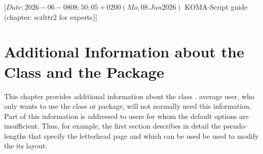 %
%
%
%
%
%
%

                 [$Date: 2026-06-08 08:50:05 +0200 (Mo, 08. Jun 2026) $
                  KOMA-Script guide (chapter: scrlttr2 for experts)]


\chapter{Additional Information about the  Class and the
  Package}

\BeginIndexGroup
{}
This chapter provides additional information about the \KOMAScript{} class
.  average user, who only wants to use the class
or package, will not normally need this information. Part of this information
is addressed to users for whom the default options are insufficient. Thus,
for example, the first section describes in detail the pseudo-lengths that
specify the letterhead page and which can be used be used to modify the its
layout.%

